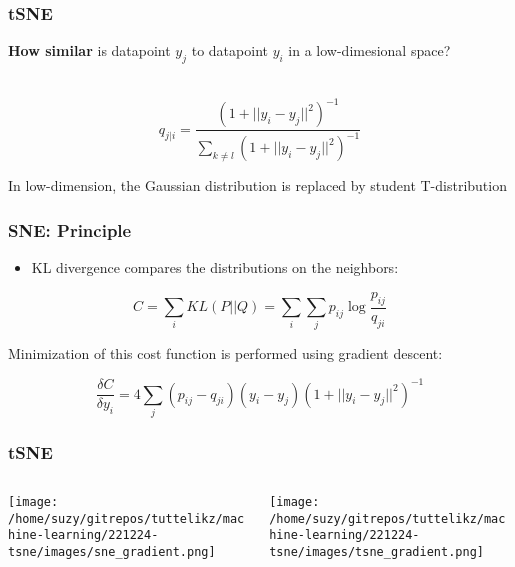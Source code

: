 \documentclass{beamer}
\begin{document}
    \begin{frame}
        \frametitle{tSNE}
        \textbf{How similar} is datapoint $y_j$ to datapoint $y_i$ in a low-dimesional space?\\~\\
        
        \begin{center}
            $$q_{j|i}=\frac{(1+||y_i-y_j||^2)^{-1}}{\sum_{k\not=l}^{}(1+||y_i-y_j||^2)^{-1}}$$
        \end{center}
        \bigskip
        In low-dimension, the Gaussian distribution is replaced by student T-distribution
    \end{frame}
    \begin{frame}
        \frametitle{SNE: Principle}
        \begin{itemize}
            \item KL divergence compares the distributions on the neighbors:
        \end{itemize}
        
        \begin{center}
            $$C=\sum_{i}^{} KL(P||Q) = \sum_{i}^{}\sum_{j}^{} p_{ij}\log{\frac{p_{ij}}{q_{ji}}}$$
        \end{center}
        \bigskip
        Minimization of this cost function is performed using gradient descent:
        \begin{center}
            $$\frac{\delta{C}}{\delta{y_i}}=4\sum_{j}^{} (p_{ij} - {q_{ji}})(y_i-y_j)(1+||y_i-y_j||^2)^{-1}$$
        \end{center}

    \end{frame}

    
    \begin{frame}
        \frametitle{tSNE}
        \begin{columns}
            \begin{column}{0.5\textwidth}
                \texttt{[image: /home/suzy/gitrepos/tuttelikz/machine-learning/221224-tsne/images/sne\_gradient.png]}        
            \end{column}

            \begin{column}{0.5\textwidth}
                \texttt{[image: /home/suzy/gitrepos/tuttelikz/machine-learning/221224-tsne/images/tsne\_gradient.png]}        
            \end{column}
        \end{columns}
    \end{frame}
\end{document}
